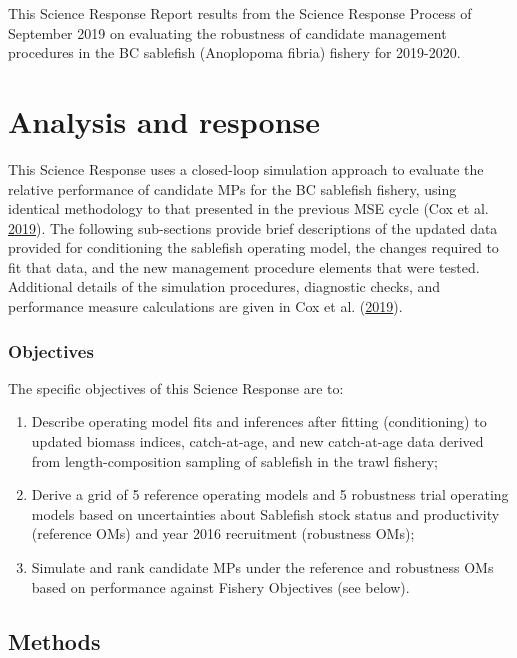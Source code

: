 \documentclass[11pt]{book}
\begin{document}
This Science Response Report results from the Science Response Process of September 2019 on evaluating the robustness of candidate management procedures in the BC sablefish (Anoplopoma fibria) fishery for 2019-2020.

\hypertarget{analysis-and-response}{%
\section{Analysis and response}\label{analysis-and-response}}

This Science Response uses a closed-loop simulation approach to evaluate the relative performance of candidate MPs for the BC sablefish fishery, using identical methodology to that presented in the previous MSE cycle (Cox et al. \protect\hyperlink{ref-cox2019evaluating}{2019}). The following sub-sections provide brief descriptions of the updated data provided for conditioning the sablefish operating model, the changes required to fit that data, and the new management procedure elements that were tested. Additional details of the simulation procedures, diagnostic checks, and performance measure calculations are given in Cox et al. (\protect\hyperlink{ref-cox2019evaluating}{2019}).

\hypertarget{objectives}{%
\subsubsection{Objectives}\label{objectives}}

The specific objectives of this Science Response are to:
\begin{enumerate}
\def\labelenumi{\arabic{enumi}.}

\item
  Describe operating model fits and inferences after fitting (conditioning) to updated biomass indices, catch-at-age, and new catch-at-age data derived from length-composition sampling of sablefish in the trawl fishery;
\item
  Derive a grid of 5 reference operating models and 5 robustness trial operating models based on uncertainties about Sablefish stock status and productivity (reference OMs) and year 2016 recruitment (robustness OMs);
\item
  Simulate and rank candidate MPs under the reference and robustness OMs based on performance against Fishery Objectives (see below).
\end{enumerate}
\hypertarget{methods}{%
\subsection{Methods}\label{methods}}
\end{document}
